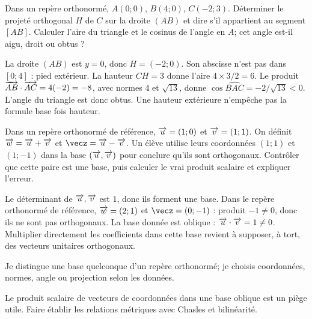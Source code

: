\label{t11s-c13-p01}
Dans un repère orthonormé, $A(0;0)$, $B(4;0)$, $C(-2;3)$. Déterminer le projeté orthogonal $H$ de $C$ sur la droite $(AB)$ et dire s’il appartient au segment $[AB]$. Calculer l’aire du triangle et le cosinus de l’angle en $A$; cet angle est-il aigu, droit ou obtus ?
\begin{corrige}\label{sol-t11s-c13-p01}
La droite $(AB)$ est $y=0$, donc $H=(-2;0)$. Son abscisse n’est pas dans $[0;4]$ : pied extérieur. La hauteur $CH=3$ donne l’aire $4\times3/2=6$. Le produit $\overrightarrow{AB}\cdot\overrightarrow{AC}=4(-2)=-8$, avec normes $4$ et $\sqrt{13}$, donne $\cos\widehat{BAC}=-2/\sqrt{13}<0$. L’angle du triangle est donc obtus. Une hauteur extérieure n’empêche pas la formule base fois hauteur.
\end{corrige}
\label{t11s-c13-p02}
Dans un repère orthonormé de référence, $\overrightarrow{u}=(1;0)$ et $\overrightarrow{v}=(1;1)$. On définit $\overrightarrow{w}=\overrightarrow{u}+\overrightarrow{v}$ et $\vecz=\vecu-\vecv$. Un élève utilise leurs coordonnées $(1;1)$ et $(1;-1)$ dans la base $(\overrightarrow{u},\overrightarrow{v})$ pour conclure qu’ils sont orthogonaux. Contrôler que cette paire est une base, puis calculer le vrai produit scalaire et expliquer l’erreur.
\begin{corrige}\label{sol-t11s-c13-p02}
Le déterminant de $\overrightarrow{u},\overrightarrow{v}$ est $1$, donc ils forment une base. Dans le repère orthonormé de référence, $\overrightarrow{w}=(2;1)$ et $\vecz=(0;-1)$ : produit $-1\ne0$, donc ils ne sont pas orthogonaux. La base donnée est oblique : $\overrightarrow{u}\cdot\overrightarrow{v}=1\ne0$. Multiplier directement les coefficients dans cette base revient à supposer, à tort, des vecteurs unitaires orthogonaux.
\end{corrige}

\begin{jemeteste}Je distingue une base quelconque d’un repère orthonormé; je choisis coordonnées, normes, angle ou projection selon les données.\end{jemeteste}
\begin{notepourlaclasse}Le produit scalaire de vecteurs de coordonnées dans une base oblique est un piège utile. Faire établir les relations métriques avec Chasles et bilinéarité.\end{notepourlaclasse}
